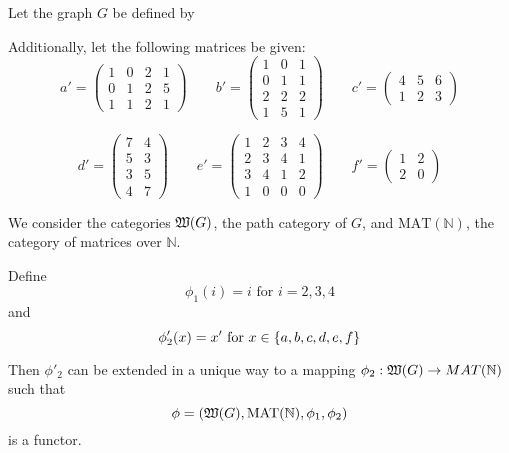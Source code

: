 \bigskip
\begin{example}
Let the graph $G$ be defined by

\begin{center}

\end{center}

Additionally, let the following matrices be given:
\[
a' = \left( \begin{array}{cccc}
1 & 0 & 2 & 1 \\ 0 & 1 & 2 & 5 \\ 1 & 1 & 2 & 1
\end{array} \right)
\qquad 
b' = \left( \begin{array}{ccc}
1 & 0 & 1 \\ 0 & 1 & 1 \\ 2 & 2 & 2 \\ 1 & 5 & 1
\end{array} \right)
\qquad 
c' = \left( \begin{array}{ccc}
4 & 5 & 6 \\ 1 & 2 & 3
\end{array} \right)
\]

\[
d' = \left( \begin{array}{cc}
7 & 4 \\ 5 & 3 \\ 3 & 5 \\ 4 & 7
\end{array} \right)
\qquad
e' = \left( \begin{array}{cccc}
1&2&3&4 \\ 2&3&4&1 \\ 3&4&1&2 \\ 1&0&0&0
\end{array} \right)
\qquad
f' = \left( \begin{array}{cc}
1&2 \\ 2&0
\end{array} \right)
\]

We consider the categories $\mbox{$\mathfrak{W}({G})$}$, the path category of $G$, and
$\mathrm{MAT}(\mathbb{N})$, the category of matrices over $\mathbb{N}$.

Define
\[ \phi_1(i) = i\text{ for }i = 2, 3, 4 \]
and
\[ \phi'_2(x) = x'\text{ for }x \in \mbox{$\{a, b, c, d, e, f\}$} \]

Then $\phi'_2$ can be extended in a unique way to a mapping $\phi_2 :
\mbox{$\mathfrak{W}({G})$} \to MAT(\mathbb{N})$ such that
\[ \phi = (\mbox{$\mathfrak{W}({G})$}, \mathrm{MAT}(\mathbb{N}), \phi_1, \phi_2) \]
is a functor.
\end{example}

